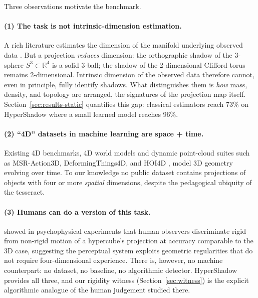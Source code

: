 \documentclass{article}
\begin{document}
Three observations motivate the benchmark.

\paragraph{(1) The task is not intrinsic-dimension estimation.} A rich literature estimates the dimension of the manifold underlying observed data \citep{levina2005mle,facco2017twonn,lee2025survey}. But a projection \emph{reduces} dimension: the orthographic shadow of the 3-sphere $S^3 \subset \mathbb{R}^4$ is a solid 3-ball; the shadow of the 2-dimensional Clifford torus remains 2-dimensional. Intrinsic dimension of the observed data therefore cannot, even in principle, fully identify shadows. What distinguishes them is \emph{how} mass, density, and topology are arranged, the signatures of the projection map itself. Section~\ref{sec:results-static} quantifies this gap: classical estimators reach 73\% on HyperShadow where a small learned model reaches 96\%.

\paragraph{(2) ``4D'' datasets in machine learning are space + time.} Existing 4D benchmarks, 4D world models and dynamic point-cloud suites such as MSR-Action3D, DeformingThings4D, and HOI4D \citep{tesseract2025,omniworld2025}, model 3D geometry evolving over time. To our knowledge no public dataset contains projections of objects with four or more \emph{spatial} dimensions, despite the pedagogical ubiquity of the tesseract.

\paragraph{(3) Humans can do a version of this task.} \citet{he2023rigidity} showed in psychophysical experiments that human observers discriminate rigid from non-rigid motion of a hypercube's projection at accuracy comparable to the 3D case, suggesting the perceptual system exploits geometric regularities that do not require four-dimensional experience. There is, however, no machine counterpart: no dataset, no baseline, no algorithmic detector. HyperShadow provides all three, and our rigidity witness (Section~\ref{sec:witness}) is the explicit algorithmic analogue of the human judgement studied there.
\end{document}

